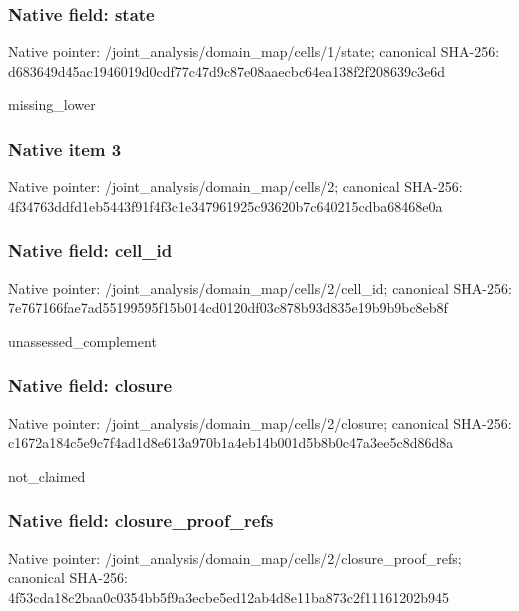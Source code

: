 \documentclass[10pt,a4paper]{article}
\begin{document}
\subsubsection{Native field: state}
Native pointer: /joint\_\allowbreak{}analysis/domain\_\allowbreak{}map/cells/1/state; canonical SHA-256: d683649d45ac1946019d0cdf77c47d9c87e08aaecbc64ea138f2f208639c3e6d

\begingroup\raggedright\sloppy missing\_\allowbreak{}lower\par\endgroup

\subsubsection{Native item 3}
Native pointer: /joint\_\allowbreak{}analysis/domain\_\allowbreak{}map/cells/2; canonical SHA-256: 4f34763ddfd1eb5443f91f4f3c1e347961925c93620b7c640215cdba68468e0a

\subsubsection{Native field: cell\_\allowbreak{}id}
Native pointer: /joint\_\allowbreak{}analysis/domain\_\allowbreak{}map/cells/2/cell\_\allowbreak{}id; canonical SHA-256: 7e767166fae7ad55199595f15b014cd0120df03c878b93d835e19b9b9bc8eb8f

\begingroup\raggedright\sloppy unassessed\_\allowbreak{}complement\par\endgroup

\subsubsection{Native field: closure}
Native pointer: /joint\_\allowbreak{}analysis/domain\_\allowbreak{}map/cells/2/closure; canonical SHA-256: c1672a184c5e9c7f4ad1d8e613a970b1a4eb14b001d5b8b0c47a3ee5c8d86d8a

\begingroup\raggedright\sloppy not\_\allowbreak{}claimed\par\endgroup

\subsubsection{Native field: closure\_\allowbreak{}proof\_\allowbreak{}refs}
Native pointer: /joint\_\allowbreak{}analysis/domain\_\allowbreak{}map/cells/2/closure\_\allowbreak{}proof\_\allowbreak{}refs; canonical SHA-256: 4f53cda18c2baa0c0354bb5f9a3ecbe5ed12ab4d8e11ba873c2f11161202b945
\end{document}
